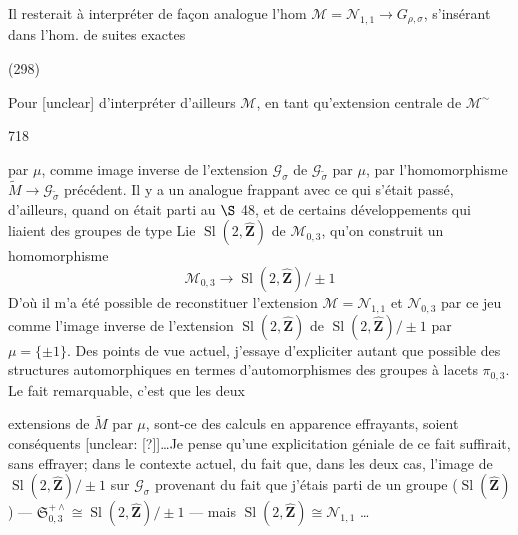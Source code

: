 Il resterait à interpréter de façon
analogue l'hom $\mathcal{M} = \mathcal{N}_{1,1} \to G_{\rho, \sigma}$,
s'insérant dans l'hom. de suites exactes

(298)

Pour [unclear] d'interpréter d'ailleurs
$\mathcal{M}$, en tant qu'extension centrale de $\mathcal{M}^\sim$

\newpage


718

par $\mu$, comme image inverse de l'extension $\mathcal{G}_{\sigma}$ de $\mathcal{G}_{\tilde{\sigma}}$ par $\mu$, par l'homomorphisme $\widetilde{M} \to \mathcal{G}_{\tilde{\sigma}}$ précédent. Il y a un analogue frappant avec ce qui s'était passé, d'ailleurs, quand on était parti au $\S$ 48, et de certains développements qui liaient des groupes de type Lie $\operatorname{Sl}(2, \hat{\mathbf{Z}})$ de $\mathcal{M}_{0,3}$, qu'on construit un homomorphisme
$$
\mathcal{M}_{0,3} \to \operatorname{Sl}(2, \hat{\mathbf{Z}})/\pm 1
$$
D'où il m'a été possible de reconstituer l'extension $\mathcal{M} = \mathcal{N}_{1,1}$ et $\mathcal{N}_{0,3}$ par ce jeu comme l'image inverse de l'extension $\operatorname{Sl}(2, \hat{\mathbf{Z}})$ de $\operatorname{Sl}(2, \hat{\mathbf{Z}})/\pm 1$ par $\mu = \{\pm 1\}$. Des points de vue actuel, j'essaye d'expliciter autant que possible des structures automorphiques en termes d'automorphismes des groupes à lacets $\pi_{0,3}$. Le fait remarquable, c'est que les deux

\newpage


extensions de $\tilde{M}$ par $\mu$, sont-ce des calculs en apparence effrayants, soient conséquents [unclear: [?]]\dots Je pense qu'une explicitation géniale de ce fait suffirait, sans effrayer; dans le contexte actuel, du fait que, dans les deux cas, l'image de $\operatorname{Sl}(2, \hat{\mathbf{Z}})/\pm 1$ sur $\mathcal{G}_{\sigma}$ provenant du fait que j'étais parti de un groupe ($\operatorname{Sl}(\hat{\mathbf{Z}})$) — $\mathfrak{S}_{0,3}^{+\wedge} \cong \operatorname{Sl}(2, \hat{\mathbf{Z}})/\pm 1$ — mais $\operatorname{Sl}(2, \hat{\mathbf{Z}}) \cong \mathcal{N}_{1,1}$ \dots

